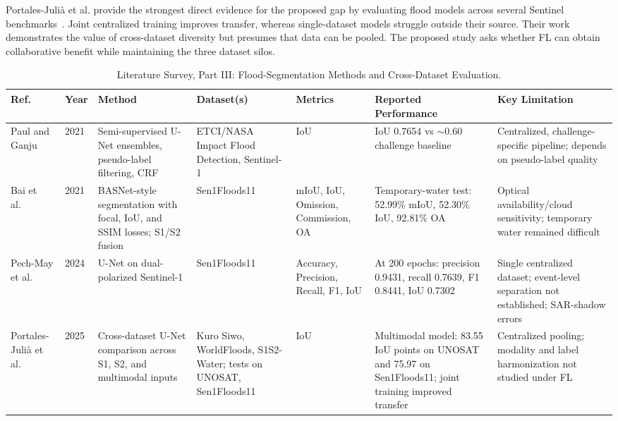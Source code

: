 \documentclass[conference]{IEEEtran}
\begin{document}
Portales-Juli\`a et al. provide the strongest direct evidence for the proposed gap by evaluating flood models across several Sentinel benchmarks~\cite{portalesjulia2025understanding}. Joint centralized training improves transfer, whereas single-dataset models struggle outside their source. Their work demonstrates the value of cross-dataset diversity but presumes that data can be pooled. The proposed study asks whether FL can obtain collaborative benefit while maintaining the three dataset silos.

\begin{table}[t]
\centering
\caption{Literature Survey, Part III: Flood-Segmentation Methods and Cross-Dataset Evaluation.}
\label{tab:lit_flood}
\small
\begin{tabularx}{\textwidth}{p{1.8cm}p{0.8cm}p{3.2cm}p{2.8cm}p{2.2cm}p{3.2cm}X}
\toprule
\textbf{Ref.} & \textbf{Year} & \textbf{Method} & \textbf{Dataset(s)} & \textbf{Metrics} & \textbf{Reported Performance} & \textbf{Key Limitation} \\
\midrule
Paul and Ganju~\cite{paul2021flood} & 2021 & Semi-supervised U-Net ensembles, pseudo-label filtering, CRF & ETCI/NASA Impact Flood Detection, Sentinel-1 & IoU & IoU 0.7654 vs $\sim$0.60 challenge baseline & Centralized, challenge-specific pipeline; depends on pseudo-label quality \\
Bai et al.~\cite{bai2021enhancement} & 2021 & BASNet-style segmentation with focal, IoU, and SSIM losses; S1/S2 fusion & Sen1Floods11 & mIoU, IoU, Omission, Commission, OA & Temporary-water test: 52.99\% mIoU, 52.30\% IoU, 92.81\% OA & Optical availability/cloud sensitivity; temporary water remained difficult \\
Pech-May et al.~\cite{pechmay2024segmentation} & 2024 & U-Net on dual-polarized Sentinel-1 & Sen1Floods11 & Accuracy, Precision, Recall, F1, IoU & At 200 epochs: precision 0.9431, recall 0.7639, F1 0.8441, IoU 0.7302 & Single centralized dataset; event-level separation not established; SAR-shadow errors \\
Portales-Juli\`a et al.~\cite{portalesjulia2025understanding} & 2025 & Cross-dataset U-Net comparison across S1, S2, and multimodal inputs & Kuro Siwo, WorldFloods, S1S2-Water; tests on UNOSAT, Sen1Floods11 & IoU & Multimodal model: 83.55 IoU points on UNOSAT and 75.97 on Sen1Floods11; joint training improved transfer & Centralized pooling; modality and label harmonization not studied under FL \\
\bottomrule
\end{tabularx}
\end{table}
\end{document}

